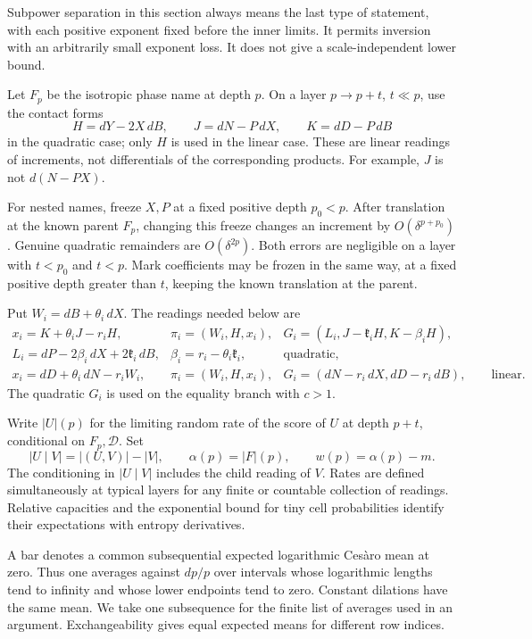 Subpower separation in this section always means the last type of
statement, with each positive exponent fixed before the inner limits.
It permits inversion with an arbitrarily small exponent loss. It does
not give a scale-independent lower bound.

Let $F_p$ be the isotropic phase name at depth $p$. On a layer
$p\to p+t$, $t\ll p$, use the contact forms
\begin{equation}\label{int:contact}
 H=dY-2X\,dB,\qquad J=dN-P\,dX,\qquad K=dD-P\,dB
\end{equation}
in the quadratic case; only $H$ is used in the linear case. These are
linear readings of increments, not differentials of the corresponding
products. For example, $J$ is not $d(N-PX)$.

For nested names, freeze $X,P$ at a fixed positive depth $p_0<p$.
After translation at the known parent $F_p$, changing this freeze
changes an increment by $O(\delta^{p+p_0})$. Genuine quadratic
remainders are $O(\delta^{2p})$. Both errors are negligible on a layer
with $t<p_0$ and $t<p$. Mark coefficients may be frozen in the same
way, at a fixed positive depth greater than $t$, keeping the known
translation at the parent.

Put $W_i=dB+\theta_i\,dX$. The readings needed below are
\begin{equation}\label{int:readings}
\begin{array}{lll}
 x_i=K+\theta_iJ-r_iH,&
 \pi_i=(W_i,H,x_i),&
 G_i=(L_i,J-\mathfrak k_iH,K-\beta_iH),\\[2pt]
 L_i=dP-2\beta_i\,dX+2\mathfrak k_i\,dB,&
 \beta_i=r_i-\theta_i\mathfrak k_i,&\text{quadratic},\\[4pt]
 x_i=dD+\theta_i\,dN-r_iW_i,&
 \pi_i=(W_i,H,x_i),&
 G_i=(dN-r_i\,dX,dD-r_i\,dB),\qquad\text{linear}.
\end{array}
\end{equation}
The quadratic $G_i$ is used on the equality branch with $c>1$.

Write $|U|(p)$ for the limiting random rate of the score of $U$ at
depth $p+t$, conditional on $F_p,\mathcal D$. Set
\[
 |U\mid V|=|(U,V)|-|V|,\qquad
 \alpha(p)=|F|(p),\qquad w(p)=\alpha(p)-m.
\]
The conditioning in $|U\mid V|$ includes the child reading of $V$.
Rates are defined simultaneously at typical layers for any finite or
countable collection of readings. Relative capacities and the
exponential bound for tiny cell probabilities identify their
expectations with entropy derivatives.

A bar denotes a common subsequential expected logarithmic Ces\`aro
mean at zero. Thus one averages against $dp/p$ over intervals whose
logarithmic lengths tend to infinity and whose lower endpoints tend
to zero. Constant dilations have the same mean. We take one
subsequence for the finite list of averages used in an argument.
Exchangeability gives equal expected means for different row indices.

